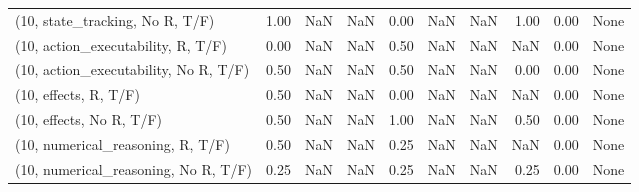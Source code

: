 \begin{table*}[h!]
\begin{adjustbox}{width=2\columnwidth,center}
\begin{tabular}{lrrr|rrr|rrr}
(10, state\_tracking, No R, T/F)       &                      1.00 &                   NaN &                       NaN &                          0.00 &                       NaN &                           NaN &                                   1.00 &                               0.00 &                                  None \\
(10, action\_executability, R, T/F)    &                      0.00 &                   NaN &                       NaN &                          0.50 &                       NaN &                           NaN &                                    NaN &                               0.00 &                                  None \\
(10, action\_executability, No R, T/F) &                      0.50 &                   NaN &                       NaN &                          0.50 &                       NaN &                           NaN &                                   0.00 &                               0.00 &                                  None \\
(10, effects, R, T/F)                 &                      0.50 &                   NaN &                       NaN &                          0.00 &                       NaN &                           NaN &                                    NaN &                               0.00 &                                  None \\
(10, effects, No R, T/F)              &                      0.50 &                   NaN &                       NaN &                          1.00 &                       NaN &                           NaN &                                   0.50 &                               0.00 &                                  None \\
(10, numerical\_reasoning, R, T/F)     &                      0.50 &                   NaN &                       NaN &                          0.25 &                       NaN &                           NaN &                                    NaN &                               0.00 &                                  None \\
(10, numerical\_reasoning, No R, T/F)  &                      0.25 &                   NaN &                       NaN &                          0.25 &                       NaN &                           NaN &                                   0.25 &                               0.00 &                                  None \\

\end{tabular}
\end{adjustbox}
\end{table*}
